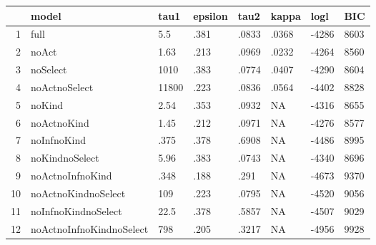 \begin{table}[ht]
\centering
\begin{tabular}{rlllllll}
  \hline
 & model & tau1 & epsilon & tau2 & kappa & logl & BIC \\ 
  \hline
1 & full & 5.5 & .381 & .0833 & .0368 & -4286 & 8603 \\ 
  2 & noAct & 1.63 & .213 & .0969 & .0232 & -4264 & 8560 \\ 
  3 & noSelect & 1010 & .383 & .0774 & .0407 & -4290 & 8604 \\ 
  4 & noActnoSelect & 11800 & .223 & .0836 & .0564 & -4402 & 8828 \\ 
  5 & noKind & 2.54 & .353 & .0932 & NA & -4316 & 8655 \\ 
  6 & noActnoKind & 1.45 & .212 & .0971 & NA & -4276 & 8577 \\ 
  7 & noInfnoKind & .375 & .378 & .6908 & NA & -4486 & 8995 \\ 
  8 & noKindnoSelect & 5.96 & .383 & .0743 & NA & -4340 & 8696 \\ 
  9 & noActnoInfnoKind & .348 & .188 & .291 & NA & -4673 & 9370 \\ 
  10 & noActnoKindnoSelect & 109 & .223 & .0795 & NA & -4520 & 9056 \\ 
  11 & noInfnoKindnoSelect & 22.5 & .378 & .5857 & NA & -4507 & 9029 \\ 
  12 & noActnoInfnoKindnoSelect & 798 & .205 & .3217 & NA & -4956 & 9928 \\ 
   \hline
\end{tabular}
\end{table}
